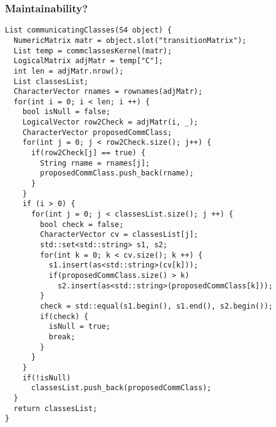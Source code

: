 \begin{frame}[fragile] \frametitle{Maintainability?}
\vspace{2.7em}
\begin{verbatim}
List communicatingClasses(S4 object) {
  NumericMatrix matr = object.slot("transitionMatrix");
  List temp = commclassesKernel(matr);
  LogicalMatrix adjMatr = temp["C"];
  int len = adjMatr.nrow();
  List classesList;
  CharacterVector rnames = rownames(adjMatr);
  for(int i = 0; i < len; i ++) {
    bool isNull = false;
    LogicalVector row2Check = adjMatr(i, _);
    CharacterVector proposedCommClass;
    for(int j = 0; j < row2Check.size(); j++) {
      if(row2Check[j] == true) {
        String rname = rnames[j];
        proposedCommClass.push_back(rname);
      }
    }
    if (i > 0) {
      for(int j = 0; j < classesList.size(); j ++) {
        bool check = false;        
        CharacterVector cv = classesList[j];
        std::set<std::string> s1, s2;
        for(int k = 0; k < cv.size(); k ++) {
          s1.insert(as<std::string>(cv[k]));
          if(proposedCommClass.size() > k)
            s2.insert(as<std::string>(proposedCommClass[k]));
        }
        check = std::equal(s1.begin(), s1.end(), s2.begin());
        if(check) {
          isNull = true;
          break;
        }
      }
    }
    if(!isNull) 
      classesList.push_back(proposedCommClass);
  }
  return classesList;
}
\end{verbatim}
\end{frame}

